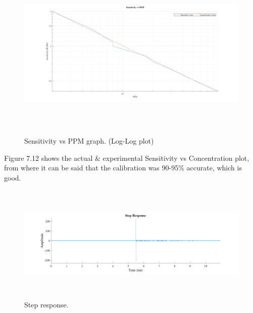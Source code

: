 \begin{enumerate}[label=\roman*]
\vspace{\baselineskip}



\begin{figure}[H]
	\begin{Center}
		\includegraphics[width=6.42in,height=3.33in]{26}
		\caption{Sensitivity vs PPM graph. (Log-Log plot)}
		\label{fig:_12_Sensitivity_vs_PPM_graph_LogLog_plot}
	\end{Center}
\end{figure}



\par

\par
\begin{justify}
Figure 7.12 shows the actual $\&$  experimental Sensitivity vs Concentration plot, from where it can be said that the calibration was 90-95$\%$  accurate, which is good.
\end{justify}\par

\vspace{\baselineskip}



\begin{figure}[H]
	\begin{Center}
		\includegraphics[width=6.5in,height=2.22in]{27}
	\end{Center}
\caption{Step response.}
\end{figure}



\end{enumerate}

